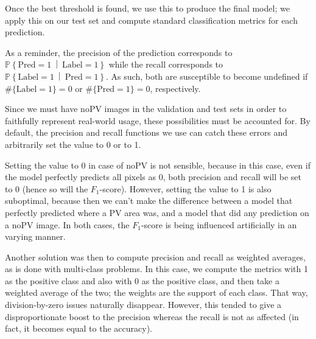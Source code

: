 \documentclass[10pt,conference]{IEEEtran}
\renewcommand\P[1]{\mathbb{P}\!\left\{#1\right\}}
\newcommand\given{\:\middle|\:}
\newcommand\tl[1]{\{\text{Label} = #1\}}
\newcommand\pl[1]{\{\text{Pred} = #1\}}
\newcommand\tp{\{\text{Pred} = 1 \cap \text{Label} = 1\}}
\newcommand\tn{\{\text{Pred} = 0 \cap \text{Label} = 0\}}
\begin{document}
Once the best threshold is found, we use this to produce
the final model; we apply this on our test set and compute
standard classification metrics for each prediction.


As a reminder, the precision of the prediction
corresponds to $\P{\text{Pred}=1 \given \text{Label} = 1}$ while
the recall corresponds to $\P{\text{Label}=1 \given \text{Pred} = 1}$.
As such, both are susceptible to become undefined if
$\#\tl1 = 0$ or $\#\pl1 = 0$, respectively.

Since we must have noPV images in the validation and test sets in order to faithfully represent real-world usage,
these possibilities must be accounted for.
By default, the precision and recall functions we use
can catch these errors and arbitrarily set the value to
0 or to 1.

Setting the value to 0 in case of noPV is not sensible,
because in this case, even if the model perfectly predicts
all pixels as 0, both precision and recall will be set to 0
(hence so will the $F_1$-score).
However, setting the value to 1 is also suboptimal, because
then we can't make the difference between a model that
perfectly predicted where a PV area was, and a model
that did any prediction on a noPV image.
In both cases, the $F_1$-score is being influenced artificially in an varying manner.

Another solution was then to compute precision and recall
as weighted averages, as is done with multi-class
problems.
In this case, we compute the metrics 
with 1 as the positive class and also with 0 as the
positive class, and then take a weighted average of
the two; the weights are the support of each class.
That way, division-by-zero issues naturally disappear.
However, this tended to give a disproportionate
boost to the precision whereas the recall is not as
affected (in fact, it becomes equal to the accuracy).

% 
\end{document}
